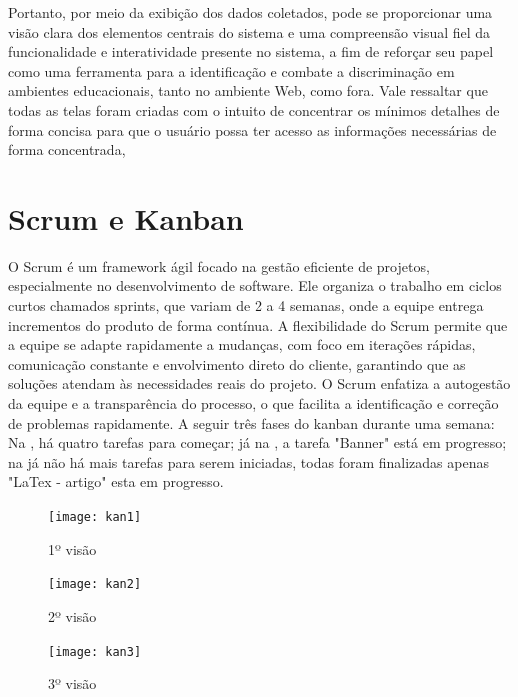 \documentclass[
  a4paper,%
  12pt,%
  english,%
  brazilian,%
]{article}
\begin{document}
            
            Portanto, por meio da exibição dos dados coletados, pode se proporcionar uma visão clara dos elementos centrais do sistema e uma compreensão visual fiel da funcionalidade e interatividade presente no sistema, a fim de reforçar seu papel como uma ferramenta para a identificação e combate a discriminação em ambientes educacionais, tanto no ambiente Web, como fora. Vale ressaltar que todas as telas foram criadas com o intuito de concentrar os mínimos detalhes de forma concisa para que o usuário possa ter acesso as informações necessárias de forma concentrada, 
            
            
            
            
\section*{Scrum e Kanban}

O Scrum é um framework ágil focado na gestão eficiente de projetos, especialmente no desenvolvimento de software. Ele organiza o trabalho em ciclos curtos chamados sprints, que variam de 2 a 4 semanas, onde a equipe entrega incrementos do produto de forma contínua. A flexibilidade do Scrum permite que a equipe se adapte rapidamente a mudanças, com foco em iterações rápidas, comunicação constante e envolvimento direto do cliente, garantindo que as soluções atendam às necessidades reais do projeto. O Scrum enfatiza a autogestão da equipe e a transparência do processo, o que facilita a identificação e correção de problemas rapidamente. A seguir três fases do kanban durante uma semana: Na , há quatro tarefas para começar; já na , a tarefa "Banner" está em progresso; na  já não há mais tarefas para serem iniciadas, todas foram finalizadas apenas "LaTex - artigo" esta em progresso. 

\begin{figure}[H]
    \centering
    \caption{1º visão}%
    \label{fig:1}
    \texttt{[image: kan1]}
    \end{figure}


    \begin{figure}[H]
        \centering
        \caption{2º visão}%
        \label{fig:2}
        \texttt{[image: kan2]}
        \end{figure}


        \begin{figure}[H]
            \centering
            \caption{3º visão}%
            \label{fig:3}
            \texttt{[image: kan3]}
            \end{figure}











        
    
\end{document}
